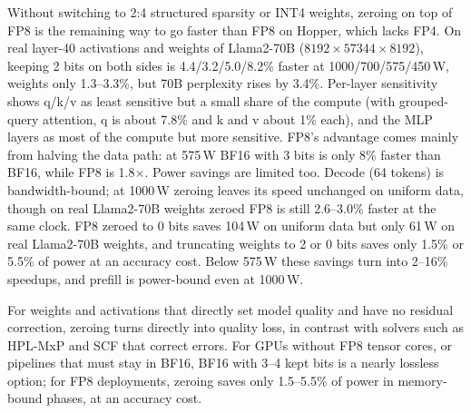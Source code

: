\documentclass[conference]{IEEEtran}
\newcommand{\W}{\,W}
\newcommand{\pct}{\%}
\begin{document}
Without switching to 2:4 structured sparsity or INT4 weights, zeroing on top of FP8 is the remaining way to go faster
than FP8 on Hopper, which lacks FP4. On real layer-40 activations and weights of Llama2-70B
($8192{\times}57344{\times}8192$), keeping 2 bits on both sides is 4.4/3.2/5.0/8.2\pct{} faster at
1000/700/575/450\W, weights only 1.3--3.3\pct, but 70B perplexity rises by 3.4\pct. Per-layer sensitivity shows
q/k/v as least sensitive but a small share of the compute (with grouped-query attention, q is about 7.8\pct{} and k
and v about 1\pct{} each), and the MLP layers as most of the compute but more sensitive. FP8's
advantage comes mainly from halving the data path: at 575\W{} BF16 with 3 bits is only 8\pct{} faster than BF16,
while FP8 is 1.8$\times$. Power savings are limited too. Decode (64 tokens) is bandwidth-bound; at 1000\W{} zeroing
leaves its speed unchanged on uniform data, though on real Llama2-70B weights zeroed FP8 is still 2.6--3.0\pct{}
faster at the same clock. FP8 zeroed to 0 bits saves
104\W{} on uniform data but only 61\W{} on real Llama2-70B weights, and truncating weights to 2 or 0 bits saves only
1.5\pct{} or 5.5\pct{} of power at an accuracy cost. Below 575\W{} these savings turn into 2--16\pct{} speedups, and
prefill is power-bound even at 1000\W.

For weights and activations that directly set model quality and have no residual correction, zeroing turns directly
into quality loss, in contrast with solvers such as HPL-MxP and SCF that correct errors. For GPUs without FP8 tensor
cores, or pipelines that must stay in BF16, BF16 with 3--4 kept bits is a nearly lossless option; for FP8 deployments,
zeroing saves only 1.5--5.5\pct{} of power in memory-bound phases, at an accuracy cost.
\end{document}
